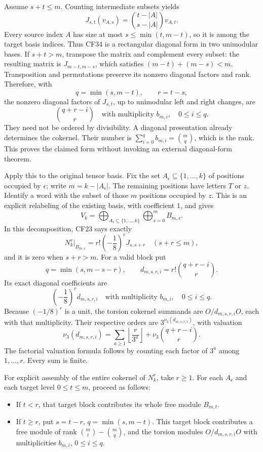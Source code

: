 Assume \(s+t\leq m\). Counting intermediate subsets yields
\[
 J_{s,t}(v_{A,s})
 =\binom{t-|A|}{s-|A|}v_{A,t}.
 \tag{CF34}
\]
Every source index \(A\) has size at most \(s\leq\min(t,m-t)\), so it is among the target basis indices. Thus CF34 is a rectangular diagonal form in two unimodular bases. If \(s+t>m\), transpose the matrix and complement every subset: the resulting matrix is \(J_{m-t,m-s}\), which satisfies \((m-t)+(m-s)<m\). Transposition and permutations preserve its nonzero diagonal factors and rank. Therefore, with
\[
 q=\min(s,m-t),\qquad r=t-s,
\]
the nonzero diagonal factors of \(J_{s,t}\), up to unimodular left and right changes, are
\[
 \binom{q+r-i}{r}
 \quad\text{with multiplicity }b_{m,i},\quad0\leq i\leq q.
 \tag{CF35}
\]
They need not be ordered by divisibility. A diagonal presentation already determines the cokernel. Their number is \(\sum_{i=0}^q b_{m,i}=\binom mq\), which is the rank. This proves the claimed form without invoking an external diagonal-form theorem.

Apply this to the original tensor basis. Fix the set \(A_\epsilon\subseteq\{1,\ldots,k\}\) of positions occupied by \(\epsilon\); write \(m=k-|A_\epsilon|\). The remaining positions have letters \(T\) or \(z\). Identify a word with the subset of those \(m\) positions occupied by \(z\). This is an explicit relabeling of the existing basis, with coefficient \(1\), and gives
\[
 V_k=\bigoplus_{A_\epsilon\subseteq\{1,\ldots,k\}}
       \bigoplus_{s=0}^{m}B_{m,s}.
 \tag{CF36}
\]
In this decomposition, CF23 says exactly
\[
 N_k^r|_{B_{m,s}}=r!\left(-\frac18\right)^r J_{s,s+r}
 \quad(s+r\leq m),
 \tag{CF37}
\]
and it is zero when \(s+r>m\). For a valid block put
\[
 q=\min(s,m-s-r),\qquad
 d_{m,s,r,i}=r!\binom{q+r-i}{r}.
 \tag{CF38}
\]
Its exact diagonal coefficients are
\[
 \left(-\frac18\right)^r d_{m,s,r,i}
 \quad\text{with multiplicity }b_{m,i},\quad0\leq i\leq q.
 \tag{CF39}
\]
Because \((-1/8)^r\) is a unit, the torsion cokernel summands are \(O/d_{m,s,r,i}O\), each with that multiplicity. Their respective orders are \(3^{\nu_3(d_{m,s,r,i})}\), with valuation
\[
 \nu_3(d_{m,s,r,i})
 =\sum_{a\geq1}\left\lfloor\frac r{3^a}\right\rfloor
  +\nu_3\!\binom{q+r-i}{r}.
 \tag{CF40}
\]
The factorial valuation formula follows by counting each factor of \(3^a\) among \(1,\ldots,r\). Every sum is finite.

For explicit assembly of the entire cokernel of \(N_k^r\), take \(r\geq1\). For each \(A_\epsilon\) and each target level \(0\leq t\leq m\), proceed as follows:

\begin{itemize}
\tightlist
\item
  If \(t<r\), that target block contributes its whole free module \(B_{m,t}\).
\item
  If \(t\geq r\), put \(s=t-r\), \(q=\min(s,m-t)\). This target block contributes a free module of rank \(\binom mt-\binom mq\), and the torsion modules \(O/d_{m,s,r,i}O\) with multiplicities \(b_{m,i}\), \(0\leq i\leq q\).
\end{itemize}

